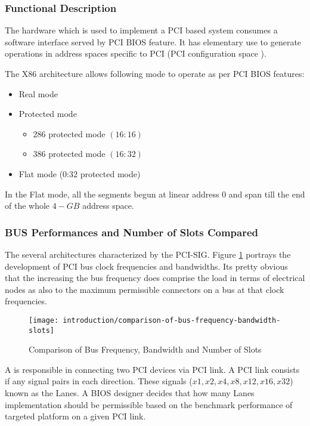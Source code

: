 \subsubsection{Functional Description}
The hardware which is used to implement a PCI based system consumes a software interface served by PCI BIOS feature. It has elementary use to generate operations in address spaces specific to PCI (PCI configuration space \cite{pci-config-space}).

The X86 architecture allows following mode to operate as per PCI BIOS features:
\begin{itemize}
  \item Real mode
  \item Protected mode
    \begin{itemize}
      \item $ 286 $ protected mode $ (16:16) $
      \item $ 386 $ protected mode $ (16:32) $
    \end{itemize}
  \item Flat mode (0:32 protected mode)
\end{itemize}
In the Flat mode, all the segments begun at linear address $ 0 $ and span till the end of the whole $ 4-GB $ address space.

\subsubsection{BUS Performances and Number of Slots Compared}
The several architectures characterized by the PCI-SIG\cite{pcisig}. Figure \ref{fig:comparison-of-bus-frequency-bandwidth-slots} portrays the development of PCI bus clock frequencies and bandwidths. Its pretty obvious that the increasing the bus frequency does comprise the load in terms of electrical nodes as also to the maximum permissible connectors on a bus at that clock frequencies.

\begin{figure}[!htbp]
	\centering
	\texttt{[image: introduction/comparison-of-bus-frequency-bandwidth-slots]}
	\caption{Comparison of Bus Frequency, Bandwidth and Number of Slots}\label{fig:comparison-of-bus-frequency-bandwidth-slots}
\end{figure}

A  is responsible in connecting two PCI devices via PCI link. A PCI link consists if any signal pairs in each direction. These signals ($ x1, x2, x4, x8, x12, x16, x32 $) known as the Lanes. A BIOS designer decides that how many Lanes implementation should be permissible based on the benchmark performance of targeted platform on a given PCI link.

